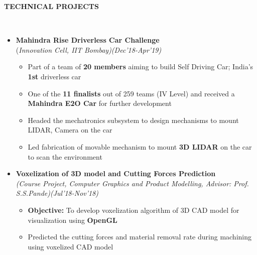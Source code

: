 \documentclass[a4paper,10pt]{article}
\newcommand{\resheading}[1]{{\small \colorbox{mygrey}{\begin{minipage}{0.99\textwidth}{\textbf{#1 \vphantom{p\^{E}}}}\end{minipage}}}}
\begin{document}
\newpage
\noindent
\resheading{\textbf{TECHNICAL PROJECTS}}\\[-0.3cm]
\begin{itemize}%

\item \textbf{Mahindra Rise Driverless Car Challenge}\\
(\emph{Innovation Cell, IIT Bombay)\hfill (Dec’18-Apr'19)} \\[-0.4cm]
    \vspace{-0.05cm}
	\begin{itemize}[noitemsep,nolistsep]
    \item Part of a team of \textbf{20 members} aiming to build Self Driving Car; India’s \textbf{1st} driverless car
    \item One of the \textbf{11 finalists} out of 259 teams (IV Level) and received a \textbf{Mahindra E2O Car} for further development
     \item Headed the mechatronics subsystem to design mechanisms to mount LIDAR, Camera on the car 
    \item Led fabrication of movable mechanism to mount \textbf{3D LIDAR} on the car to scan the environment 
	\end{itemize}
	
\item \textbf{Voxelization of 3D model and Cutting Forces Prediction}\\
\emph{(Course Project, Computer Graphics and Product Modelling, Advisor: Prof. S.S.Pande)\hfill (Jul'18-Nov’18)} \\[-0.4cm]
    \vspace{-0.05cm}
	\begin{itemize}[noitemsep,nolistsep]
    \item \textbf{Objective:} To develop voxelization algorithm of 3D CAD model for visualization using \textbf{OpenGL}
    \item Predicted the cutting forces and material removal rate during machining using voxelized CAD model
	\end{itemize}
	

\end{itemize}
\end{document}
